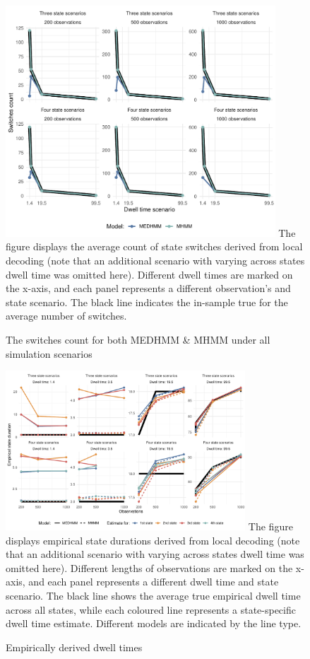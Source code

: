 \begin{figure}[h]
\caption{The switches count for both MEDHMM \& MHMM under all simulation scenarios}
    \centering
    \includegraphics[width=0.9\textwidth]{graphics/switches_fin.pdf}
    \flushleft
    \footnotesize
    \justifying
    The figure displays the average count of state switches derived from local decoding (note that an additional scenario with varying across states dwell time was omitted here). Different dwell times are marked on the x-axis, and each panel represents a different observation's and state scenario. The black line indicates the in-sample true for the average number of switches.
    \label{state_switches}
\end{figure}

\begin{figure}[h]
\caption{Empirically derived dwell times}
    \centering
    \includegraphics[width=0.8\textwidth]{graphics/dwell_time_plot.pdf}
    \flushleft
    \footnotesize
    \justifying
  The figure displays empirical state durations derived from local decoding (note that an additional scenario with varying across states dwell time was omitted here). Different lengths of observations are marked on the x-axis, and each panel represents a different dwell time and state scenario. The black line shows the average true empirical dwell time across all states, while each coloured line represents a state-specific dwell time estimate. Different models are indicated by the line type. 
    \label{empiric_dwell}
\end{figure}
